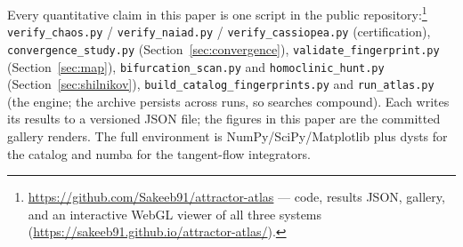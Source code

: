 \documentclass[11pt]{article}
\begin{document}
Every quantitative claim in this paper is one script in the public
repository:\footnote{\url{https://github.com/Sakeeb91/attractor-atlas} ---
code, results JSON, gallery, and an interactive WebGL viewer of all three
systems (\url{https://sakeeb91.github.io/attractor-atlas/}).}
\texttt{verify\_chaos.py} / \texttt{verify\_naiad.py} /
\texttt{verify\_cassiopea.py} (certification),
\texttt{convergence\_study.py} (Section~\ref{sec:convergence}),
\texttt{validate\_fingerprint.py} (Section~\ref{sec:map}),
\texttt{bifurcation\_scan.py} and \texttt{homoclinic\_hunt.py}
(Section~\ref{sec:shilnikov}), \texttt{build\_catalog\_fingerprints.py}
and \texttt{run\_atlas.py} (the engine; the archive persists across runs,
so searches compound). Each writes its results to a versioned JSON file;
the figures in this paper are the committed gallery renders. The full
environment is NumPy/SciPy/Matplotlib plus \textsf{dysts} for the catalog
and \textsf{numba} for the tangent-flow integrators.



\end{document}
